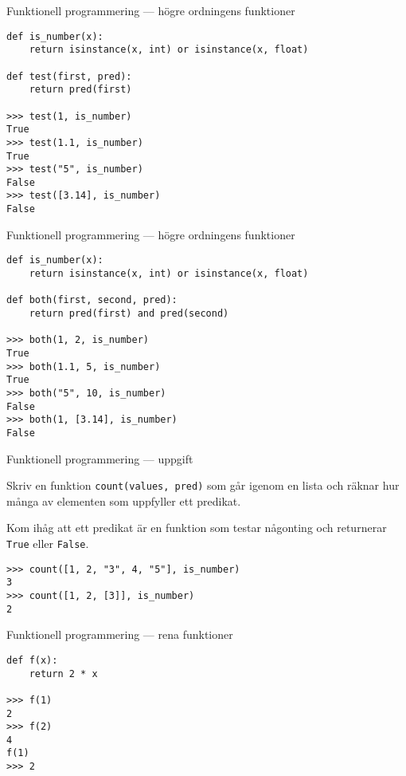 \documentclass{beamer}
\begin{document}
  \begin{frame}[fragile]{Funktionell programmering --- högre ordningens funktioner}

    \begin{lstlisting}
def is_number(x):
    return isinstance(x, int) or isinstance(x, float)

def test(first, pred):
    return pred(first)

>>> test(1, is_number)
True
>>> test(1.1, is_number)
True
>>> test("5", is_number)
False
>>> test([3.14], is_number)
False
    \end{lstlisting}

  \end{frame}

  \begin{frame}[fragile]{Funktionell programmering --- högre ordningens funktioner}

    \begin{lstlisting}
def is_number(x):
    return isinstance(x, int) or isinstance(x, float)

def both(first, second, pred):
    return pred(first) and pred(second)

>>> both(1, 2, is_number)
True
>>> both(1.1, 5, is_number)
True
>>> both("5", 10, is_number)
False
>>> both(1, [3.14], is_number)
False
    \end{lstlisting}

  \end{frame}

  \begin{frame}[fragile]{Funktionell programmering --- uppgift}

    Skriv en funktion \texttt{count(values, pred)} som går igenom en lista och
    räknar hur många av elementen som uppfyller ett predikat.

    Kom ihåg att ett predikat är en funktion som testar någonting och
    returnerar \texttt{True} eller \texttt{False}.

    \begin{lstlisting}
>>> count([1, 2, "3", 4, "5"], is_number)
3
>>> count([1, 2, [3]], is_number)
2
    \end{lstlisting}

  \end{frame}

  \begin{frame}[fragile]{Funktionell programmering --- rena funktioner}

    \begin{lstlisting}
def f(x):
    return 2 * x

>>> f(1)
2
>>> f(2)
4
f(1)
>>> 2
    \end{lstlisting}

  \end{frame}
\end{document}
